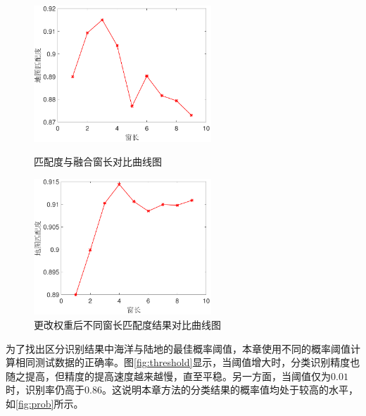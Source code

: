 \begin{figure}[hbt]
	\centering
	\begin{minipage}{7cm}
		\centering
		\includegraphics[width=6.67cm]{figures/othr/window}
		\caption{匹配度与融合窗长对比曲线图}
		\label{fig:window}
	\end{minipage}
	\hspace{10pt}
	\begin{minipage}{7cm}
		\centering
		\includegraphics[width=6.67cm]{figures/othr/weighted_window}
		\caption{更改权重后不同窗长匹配度结果对比曲线图}
		\label{fig:weighted_window}
	\end{minipage}

\end{figure}


为了找出区分识别结果中海洋与陆地的最佳概率阈值，本章使用不同的概率阈值计算相同测试数据的正确率。图\ref{fig:threshold}显示，当阈值增大时，分类识别精度也随之提高，但精度的提高速度越来越慢，直至平稳。另一方面，当阈值仅为$0.01$时，识别率仍高于$0.86$。这说明本章方法的分类结果的概率值均处于较高的水平，如\ref{fig:prob}所示。

